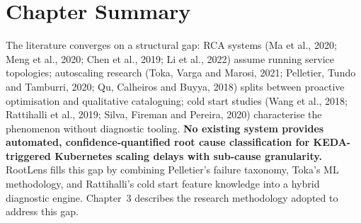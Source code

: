 \section{Chapter Summary}
The literature converges on a structural gap: RCA systems (Ma et al., 2020; Meng et al., 2020; Chen et al., 2019; Li et al., 2022) assume running service topologies; autoscaling research (Toka, Varga and Marosi, 2021; Pelletier, Tundo and Tamburri, 2020; Qu, Calheiros and Buyya, 2018) splits between proactive optimisation and qualitative cataloguing; cold start studies (Wang et al., 2018; Rattihalli et al., 2019; Silva, Fireman and Pereira, 2020) characterise the phenomenon without diagnostic tooling. \textbf{No existing system provides automated, confidence-quantified root cause classification for KEDA-triggered Kubernetes scaling delays with sub-cause granularity.} RootLens fills this gap by combining Pelletier's failure taxonomy, Toka's ML methodology, and Rattihalli's cold start feature knowledge into a hybrid diagnostic engine. Chapter~3 describes the research methodology adopted to address this gap.